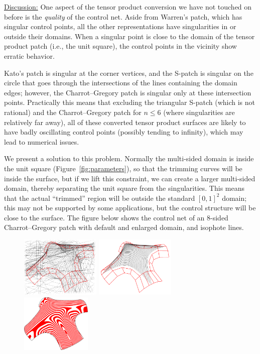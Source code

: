 \documentclass{article}
\begin{document}
\vspace{10pt}
\noindent\underline{Discussion:}\vspace{0.2em}\newline
One aspect of the tensor product conversion we have not touched on before is the \emph{quality}
of the control net. Aside from Warren's patch, which has singular control points,
all the other representations have singularities in or outside their domains.
When a singular point is close to the domain of the tensor product patch (i.e., the unit square),
the control points in the vicinity show erratic behavior.

Kato's patch is singular at the corner vertices, and the S-patch is singular on the circle that goes
through the intersections of the lines containing the domain edges; however, the Charrot--Gregory patch
is singular only at these intersection points. Practically this means that excluding the triangular
S-patch (which is not rational) and the Charrot--Gregory patch for $n\leq6$ (where singularities are
relatively far away), all of these converted tensor product surfaces are likely to have
badly oscillating control points (possibly tending to infinity), which may lead to numerical issues.

We present a solution to this problem. Normally the multi-sided domain is inside the unit
square (Figure~\ref{fig:parameters}), so that the trimming curves will be inside the
surface, but if we lift this constraint, we can create a larger multi-sided domain,
thereby separating the unit square from the singularities. This means that the actual ``trimmed''
region will be outside the standard $[0,1]^2$ domain; this may not be supported by some
applications, but the control structure will be close to the surface. The figure below shows
the control net of an 8-sided Charrot--Gregory patch with default and enlarged domain,
and isophote lines.
\begin{figure}[h!]
  \includegraphics[width = 0.34\textwidth]{images/8sided-1.png}
  \hfill
  \includegraphics[width = 0.34\textwidth]{images/8sided-2.png}
  \hfill
  \includegraphics[width = 0.3\textwidth]{images/8sided-3.png}
\end{figure}
\end{document}
